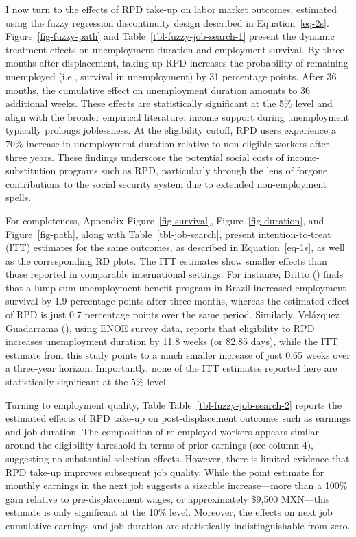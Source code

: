 \documentclass[
  4pt,
]{report}
\begin{document}
I now turn to the effects of RPD take-up on labor market outcomes,
estimated using the fuzzy regression discontinuity design described in
Equation~\ref{eq-2s}. Figure~\ref{fig-fuzzy-path} and
Table~\ref{tbl-fuzzy-job-search-1} present the dynamic treatment effects
on unemployment duration and employment survival. By three months after
displacement, taking up RPD increases the probability of remaining
unemployed (i.e., survival in unemployment) by 31 percentage points.
After 36 months, the cumulative effect on unemployment duration amounts
to 36 additional weeks. These effects are statistically significant at
the 5\% level and align with the broader empirical literature: income
support during unemployment typically prolongs joblessness. At the
eligibility cutoff, RPD users experience a 70\% increase in unemployment
duration relative to non-eligible workers after three years. These
findings underscore the potential social costs of income-substitution
programs such as RPD, particularly through the lens of forgone
contributions to the social security system due to extended
non-employment spells.

For completeness, Appendix Figure~\ref{fig-survival},
Figure~\ref{fig-duration}, and Figure~\ref{fig-path}, along with
Table~\ref{tbl-job-search}, present intention-to-treat (ITT) estimates
for the same outcomes, as described in Equation~\ref{eq-1s}, as well as
the corresponding RD plots. The ITT estimates show smaller effects than
those reported in comparable international settings. For instance,
Britto () finds that a lump-sum
unemployment benefit program in Brazil increased employment survival by
1.9 percentage points after three months, whereas the estimated effect
of RPD is just 0.7 percentage points over the same period. Similarly,
Velázquez Guadarrama (),
using ENOE survey data, reports that eligibility to RPD increases
unemployment duration by 11.8 weeks (or 82.85 days), while the ITT
estimate from this study points to a much smaller increase of just 0.65
weeks over a three-year horizon. Importantly, none of the ITT estimates
reported here are statistically significant at the 5\% level.

Turning to employment quality, Table Table~\ref{tbl-fuzzy-job-search-2}
reports the estimated effects of RPD take-up on post-displacement
outcomes such as earnings and job duration. The composition of
re-employed workers appears similar around the eligibility threshold in
terms of prior earnings (see column 4), suggesting no substantial
selection effects. However, there is limited evidence that RPD take-up
improves subsequent job quality. While the point estimate for monthly
earnings in the next job suggests a sizeable increase---more than a
100\% gain relative to pre-displacement wages, or approximately \$9,500
MXN---this estimate is only significant at the 10\% level. Moreover, the
effects on next job cumulative earnings and job duration are
statistically indistinguishable from zero.
\end{document}

